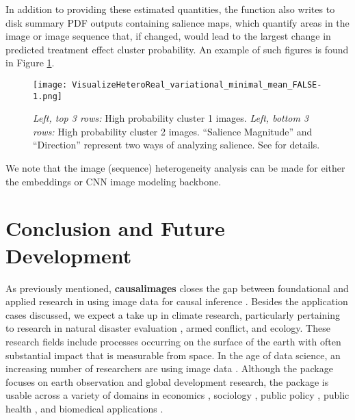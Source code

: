 \documentclass[nojss,shortnames]{jss} %
\begin{document}
In addition to providing these estimated quantities, the function also writes to disk summary PDF outputs containing salience maps, which quantify areas in the image or image sequence that, if changed, would lead to the largest change in predicted treatment effect cluster probability. An example of such figures is found in Figure \ref{fig:ImageExemplars}. 
\begin{figure}[ht]
 \begin{center}  
\texttt{[image: VisualizeHeteroReal\_variational\_minimal\_mean\_FALSE-1.png]}
\caption{\emph{Left, top 3 rows:}  High  probability cluster 1 images. \emph{Left, bottom 3 rows:} High probability cluster 2 images. ``Salience Magnitude'' and ``Direction'' represent two ways of analyzing salience. See \cite{jejoda2022_hetero} for details. 
}\label{fig:ImageExemplars}
\end{center}
\end{figure}

We note that the image (sequence) heterogeneity analysis can be made for either the embeddings or CNN image modeling backbone. 


\section{Conclusion and Future Development} \label{sec:summary}
As previously mentioned, {\bf causalimages} closes the gap between foundational and applied research in using image data for causal inference \citep{jerzak2022estimating,jejoda2022_hetero}. Besides the application cases discussed, we expect a take up in climate research, particularly pertaining to research in natural disaster evaluation \citep{shiba_heterogeneity_2021,shiba_estimating_2021,kakooei_chapter_2022,daoud_what_2016}, armed conflict, and ecology. These research fields include processes occurring on the surface of the earth with often substantial impact that is measurable from space. In the age of data science, an increasing number of researchers are using image data \citep{daoud_statistical_2023}. Although the package focuses on earth observation and global development research, the package is usable across a variety of domains in economics \citep{hall_remote_2010,henderson_measuring_2012}, sociology \citep{daoud_using_2023}, public policy \citep{balgiPersonalizedPublicPolicy2022}, public health \citep{kino_scoping_2021,conklin_impact_2018},  and biomedical applications \citep{castroCausalityMattersMedical2020}. 
\end{document}
